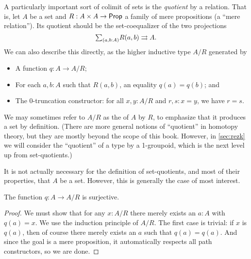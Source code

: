 A particularly important sort of colimit of sets is the \emph{quotient} by a relation.
That is, let $A$ be a set and $R:A\times A \to \mathsf{Prop} $ a family of mere propositions (a ``mere relation'').
Its quotient should be the set-coequalizer of the two projections
\[ \tsm{a,b:A} R(a,b) \rightrightarrows A. \]
We can also describe this directly, as the higher inductive type $A/R$ generated by
\begin{itemize}
\item A function $q:A\to A/R$;
\item For each $a,b:A$ such that $R(a,b)$, an equality $q(a)=q(b)$; and
\item The $0$-truncation constructor: for all $x,y:A/R$ and $r,s:x=y$, we have $r=s$.
\end{itemize}
We may sometimes refer to $A/R$ as the  of $A$ by $R$, to emphasize that it produces a set by definition.
(There are more general notions of ``quotient'' in homotopy theory, but they are mostly beyond the scope of this book.
However, in \autoref{sec:rezk} we will consider the ``quotient'' of a type by a 1-groupoid, which is the next level up from set-quotients.)

\begin{rmk}
  It is not actually necessary for the definition of set-quotients, and most of their properties, that $A$ be a set.
  However, this is generally the case of most interest.
\end{rmk}

\begin{lem}\label{thm:quotient-surjective}
  The function $q:A\to A/R$ is surjective.
\end{lem}
\begin{proof}
  We must show that for any $x:A/R$ there merely exists an $a:A$ with $q(a)=x$.
  We use the induction principle of $A/R$.
  The first case is trivial: if $x$ is $q(a)$, then of course there merely exists an $a$ such that $q(a)=q(a)$.
  And since the goal is a mere proposition, it automatically respects all path constructors, so we are done.
\end{proof}


